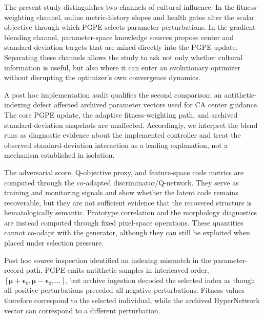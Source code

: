 The present study distinguishes two channels of cultural influence. In the fitness-weighting channel, online metric-history slopes and health gates alter the scalar objective through which PGPE selects parameter perturbations. In the gradient-blending channel, parameter-space knowledge sources propose center and standard-deviation targets that are mixed directly into the PGPE update. Separating these channels allows the study to ask not only whether cultural information is useful, but also where it can enter an evolutionary optimizer without disrupting the optimizer's own convergence dynamics.

A post hoc implementation audit qualifies the second comparison: an antithetic-indexing defect affected archived parameter vectors used for CA center guidance. The core PGPE update, the adaptive fitness-weighting path, and archived standard-deviation snapshots are unaffected. Accordingly, we interpret the blend runs as diagnostic evidence about the implemented controller and treat the observed standard-deviation interaction as a leading explanation, not a mechanism established in isolation.

The adversarial score, Q-objective proxy, and feature-space code metrics are computed through the co-adapted discriminator/Q-network. They serve as training and monitoring signals and show whether the latent code remains recoverable, but they are not sufficient evidence that the recovered structure is hematologically semantic. Prototype correlation and the morphology diagnostics are instead computed through fixed pixel-space operations. These quantities cannot co-adapt with the generator, although they can still be exploited when placed under selection pressure.

Post hoc source inspection identified an indexing mismatch in the parameter-record path. PGPE emits antithetic samples in interleaved order, $[\boldsymbol{\mu}+\boldsymbol{\epsilon}_0,\boldsymbol{\mu}-\boldsymbol{\epsilon}_0,\ldots]$, but archive ingestion decoded the selected index as though all positive perturbations preceded all negative perturbations. Fitness values therefore correspond to the selected individual, while the archived HyperNetwork vector can correspond to a different perturbation.

